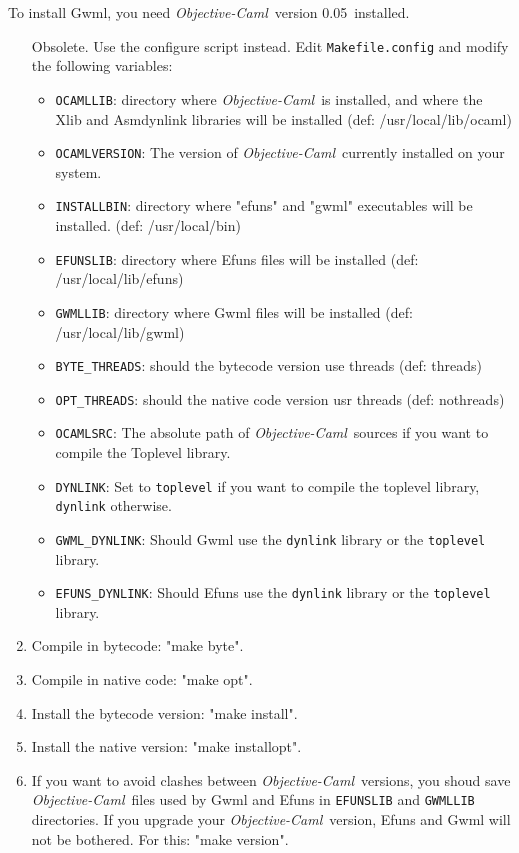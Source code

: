 \documentclass{book}
\newcommand{\ocaml}{\emph{Objective-Caml}}
\newcommand{\version}{0.05}
\begin{document}
  To install Gwml, you need \ocaml~version \version~installed.
\begin{enumerate}

\item 
[Obsolete. Use the configure script instead.]
Edit {\tt Makefile.config} and modify the following variables:
\begin{itemize}
\item {\tt OCAMLLIB}: directory where \ocaml~is installed, and where the Xlib and
 Asmdynlink libraries will be installed
  (def: /usr/local/lib/ocaml)
\item {\tt OCAMLVERSION}: The version of \ocaml~currently installed on 
your system.
\item {\tt INSTALLBIN}: directory where "efuns" and "gwml" executables will be installed.
  (def: /usr/local/bin)
\item {\tt EFUNSLIB}: directory where Efuns files will be installed
  (def: /usr/local/lib/efuns)
\item {\tt GWMLLIB}: directory where Gwml files will be installed
  (def: /usr/local/lib/gwml)
\item {\tt BYTE\_THREADS}: should the bytecode version use threads 
  (def: threads)
\item {\tt OPT\_THREADS}: should the native code version usr threads
  (def: nothreads)

\item{\tt OCAMLSRC}: The absolute path of \ocaml~sources if you want to compile
the Toplevel library.
\item{\tt DYNLINK}: Set to {\tt toplevel} if you want to compile the 
toplevel library, {\tt dynlink} otherwise.
\item{\tt GWML\_DYNLINK}: Should Gwml use the {\tt dynlink} library or the {
\tt toplevel} library.
\item{\tt EFUNS\_DYNLINK}: Should Efuns use the {\tt dynlink} library or the {
\tt toplevel} library.
\end{itemize}

\item Compile in bytecode: "make byte".
\item Compile in native code: "make opt".
\item Install the bytecode version: "make install".
\item Install the native version: "make installopt".
\item If you want to avoid clashes between \ocaml~versions, you shoud save 
\ocaml~files used by Gwml and Efuns in {\tt EFUNSLIB} and {\tt GWMLLIB}
directories. If you upgrade your \ocaml~version, Efuns and Gwml will not 
be bothered. For this: "make version".
\end{enumerate}
\end{document}
